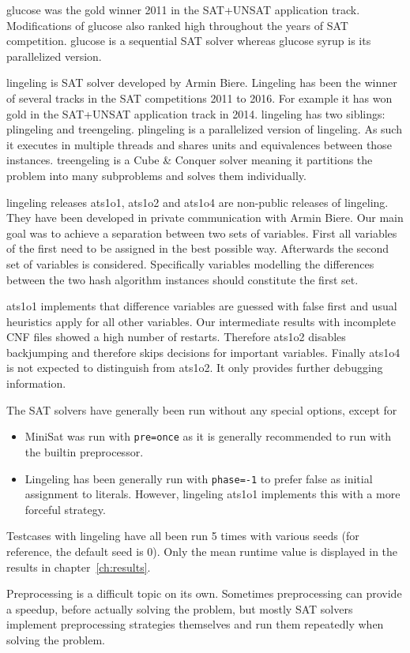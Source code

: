 glucose was the gold winner 2011 in the SAT+UNSAT application track.
Modifications of glucose also ranked high throughout the years of SAT competition.
glucose is a sequential SAT solver whereas glucose syrup is its parallelized
version.

lingeling is SAT solver developed by Armin Biere. Lingeling has been the
winner of several tracks in the SAT competitions 2011 to 2016. For example
it has won gold in the SAT+UNSAT application track in 2014.
lingeling has two siblings: plingeling and treengeling. plingeling is a
parallelized version of lingeling. As such it executes in multiple threads
and shares units and equivalences between those instances. treengeling
is a Cube \& Conquer solver meaning it partitions the problem into many
subproblems and solves them individually.

lingeling releases ats1o1, ats1o2 and ats1o4 are non-public releases of lingeling.
They have been developed in private communication with Armin Biere.
Our main goal was to achieve a separation between two sets of variables.
First all variables of the first need to be assigned in the best possible
way. Afterwards the second set of variables is considered.
Specifically variables modelling the differences between the two hash
algorithm instances should constitute the first set.

ats1o1 implements that difference variables are guessed with false first and
usual heuristics apply for all other variables.
Our intermediate results with incomplete CNF files showed a high number of restarts.
Therefore ats1o2 disables backjumping and therefore skips decisions for important variables.
Finally ats1o4 is not expected to distinguish from ats1o2. It only provides further debugging information.

The SAT solvers have generally been run without any special options, except for
\begin{itemize}
  \item MiniSat was run with \texttt{\textendash{}\textendash{}pre=once} as it is generally recommended to run with the builtin preprocessor.
  \item Lingeling has been generally run with \texttt{\textendash{}\textendash{}phase=-1} to prefer false as initial assignment to literals.
    However, lingeling ats1o1 implements this with a more forceful strategy.
\end{itemize}

Testcases with lingeling have all been run 5 times with various seeds (for reference, the default seed is 0).
Only the mean runtime value is displayed in the results in chapter~\ref{ch:results}.

Preprocessing is a difficult topic on its own. Sometimes preprocessing can provide a speedup,
before actually solving the problem, but mostly SAT solvers implement preprocessing strategies
themselves and run them repeatedly when solving the problem.
